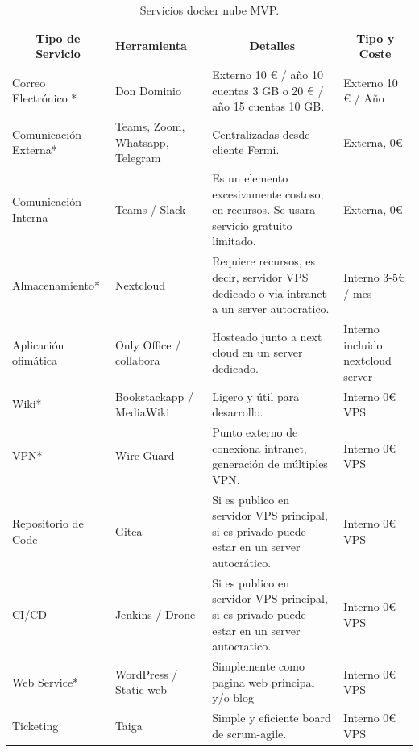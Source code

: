 \begin{table}[!htb]
\caption{Servicios docker nube MVP.}
\label{T:mvp_nube_seleccionado}
\begin{tabular}{|p{2cm}|p{3cm}|p{5cm}|p{2cm}|}
\hline
\multicolumn{1}{|c|}{\textbf{Tipo de Servicio}} & \textbf{Herramienta} & \multicolumn{1}{c|}{\textbf{Detalles}} & \multicolumn{1}{c|}{\textbf{Tipo y Coste}} \\ \hline
Correo Electrónico * & Don Dominio\cite{c_dondominio} & Externo 10 € / año 10 cuentas 3 GB o 20 € / año 15 cuentas 10 GB. & Externo 10 € / Año \\ \hline
Comunicación Externa* & Teams, Zoom, Whatsapp, Telegram & Centralizadas desde cliente Fermi. & Externa, 0€ \\ \hline
Comunicación Interna & Teams / Slack & Es un elemento excesivamente costoso, en recursos. Se usara servicio gratuito limitado. & Externa, 0€ \\ \hline
Almacenamiento* & Nextcloud\cite{c_nextcloud} & Requiere recursos, es decir, servidor VPS dedicado o via intranet a un server autocratico. & Interno 3-5€ / mes \\ \hline
Aplicación ofimática & Only Office / collabora\cite{c_colabora} & Hosteado junto a next cloud en un server dedicado. & Interno incluido nextcloud server \\ \hline
Wiki* & Bookstackapp\cite{c_bookstack} / MediaWiki\cite{c_media_wiki} & Ligero y útil para desarrollo. & Interno 0€ VPS \\ \hline
VPN* & Wire Guard\cite{c_wireguard} & Punto externo de conexiona intranet, generación de múltiples VPN. & Interno 0€ VPS \\ \hline
Repositorio de Code & Gitea\cite{c_gitea} & Si es publico en servidor VPS principal, si es privado puede estar en un server autocrático. & Interno 0€ VPS \\ \hline
CI/CD & Jenkins\cite{c_jenkins} / Drone \cite{c_drone}& Si es publico en servidor VPS principal, si es privado puede estar en un server autocratico. & Interno 0€ VPS \\ \hline
Web Service* & WordPress\cite{c_wordpress} / Static web\cite{c_hugo} & Simplemente como pagina web principal y/o blog & Interno 0€ VPS \\ \hline
Ticketing & Taiga\cite{c_taiga} & Simple y eficiente board de scrum-agile. & Interno 0€ VPS \\ \hline
\end{tabular}%
\end{table}


